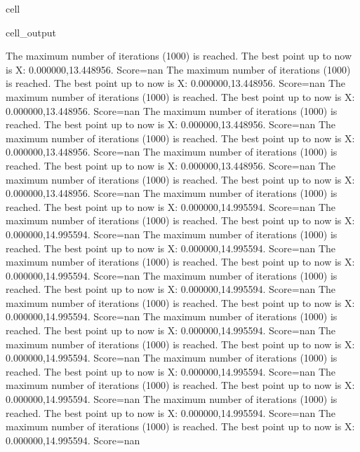 \documentclass[letterpaper,10pt,english]{jupyterBook}
\begin{document}
\begin{sphinxuseclass}{cell}
\begin{sphinxVerbatimOutput}
\begin{sphinxuseclass}{cell_output}
\begin{sphinxVerbatim}[commandchars=\\\{\}]
The maximum number of iterations (1000) is reached. The best point up to now is X: \PYGZob{}0.000000,13.448956\PYGZcb{}. Score=\PYGZhy{}nan
The maximum number of iterations (1000) is reached. The best point up to now is X: \PYGZob{}0.000000,13.448956\PYGZcb{}. Score=\PYGZhy{}nan
The maximum number of iterations (1000) is reached. The best point up to now is X: \PYGZob{}0.000000,13.448956\PYGZcb{}. Score=\PYGZhy{}nan
The maximum number of iterations (1000) is reached. The best point up to now is X: \PYGZob{}0.000000,13.448956\PYGZcb{}. Score=\PYGZhy{}nan
The maximum number of iterations (1000) is reached. The best point up to now is X: \PYGZob{}0.000000,13.448956\PYGZcb{}. Score=\PYGZhy{}nan
The maximum number of iterations (1000) is reached. The best point up to now is X: \PYGZob{}0.000000,13.448956\PYGZcb{}. Score=\PYGZhy{}nan
The maximum number of iterations (1000) is reached. The best point up to now is X: \PYGZob{}0.000000,13.448956\PYGZcb{}. Score=\PYGZhy{}nan
The maximum number of iterations (1000) is reached. The best point up to now is X: \PYGZob{}0.000000,14.995594\PYGZcb{}. Score=\PYGZhy{}nan
The maximum number of iterations (1000) is reached. The best point up to now is X: \PYGZob{}0.000000,14.995594\PYGZcb{}. Score=\PYGZhy{}nan
The maximum number of iterations (1000) is reached. The best point up to now is X: \PYGZob{}0.000000,14.995594\PYGZcb{}. Score=\PYGZhy{}nan
The maximum number of iterations (1000) is reached. The best point up to now is X: \PYGZob{}0.000000,14.995594\PYGZcb{}. Score=\PYGZhy{}nan
The maximum number of iterations (1000) is reached. The best point up to now is X: \PYGZob{}0.000000,14.995594\PYGZcb{}. Score=\PYGZhy{}nan
The maximum number of iterations (1000) is reached. The best point up to now is X: \PYGZob{}0.000000,14.995594\PYGZcb{}. Score=\PYGZhy{}nan
The maximum number of iterations (1000) is reached. The best point up to now is X: \PYGZob{}0.000000,14.995594\PYGZcb{}. Score=\PYGZhy{}nan
The maximum number of iterations (1000) is reached. The best point up to now is X: \PYGZob{}0.000000,14.995594\PYGZcb{}. Score=\PYGZhy{}nan
The maximum number of iterations (1000) is reached. The best point up to now is X: \PYGZob{}0.000000,14.995594\PYGZcb{}. Score=\PYGZhy{}nan
The maximum number of iterations (1000) is reached. The best point up to now is X: \PYGZob{}0.000000,14.995594\PYGZcb{}. Score=\PYGZhy{}nan
The maximum number of iterations (1000) is reached. The best point up to now is X: \PYGZob{}0.000000,14.995594\PYGZcb{}. Score=\PYGZhy{}nan
The maximum number of iterations (1000) is reached. The best point up to now is X: \PYGZob{}0.000000,14.995594\PYGZcb{}. Score=\PYGZhy{}nan

\end{sphinxVerbatim}
\end{sphinxuseclass}
\end{sphinxVerbatimOutput}
\end{sphinxuseclass}
\end{document}
